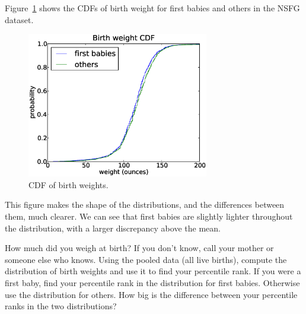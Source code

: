 \documentclass[12pt]{book}
\begin{document}

Figure~\ref{nsfg_birthwgt_cdf} shows the CDFs of birth weight for
first babies and others in the NSFG dataset.

\begin{figure}
\centerline{\includegraphics[height=2.5in]{figs/nsfg_birthwgt_cdf.eps}}
\caption{CDF of birth weights.}
\label{nsfg_birthwgt_cdf}
\end{figure}

This figure makes the shape of the distributions, and the differences
between them, much clearer.  We can see that first babies are slightly
lighter throughout the distribution, with a larger discrepancy above 
the mean.





\begin{exercise}
How much did you weigh at birth?  If you don't know, call your mother
or someone else who knows.  Using the pooled data (all live births),
compute the distribution of birth weights and use it to find your
percentile rank.  If you were a first baby, find your percentile rank
in the distribution for first babies.  Otherwise use the distribution
for others.  How big is the difference between your percentile ranks
in the two distributions?

\end{exercise}
\end{document}
